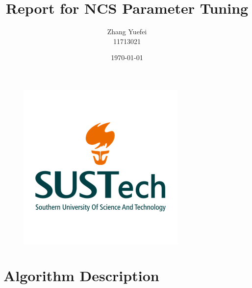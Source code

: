 


\title{Report for NCS Parameter Tuning} %

\author{
	Zhang Yuefei\\
	11713021
} %

\date{\today} %




\maketitle %
\begin{figure}[h]
	\begin{center}
		\includegraphics[scale=0.5]{SUSTech_University_Logo.png} %
	\end{center}
\end{figure}
\clearpage	%



\tableofcontents	%
\clearpage


\section{Algorithm Description}
